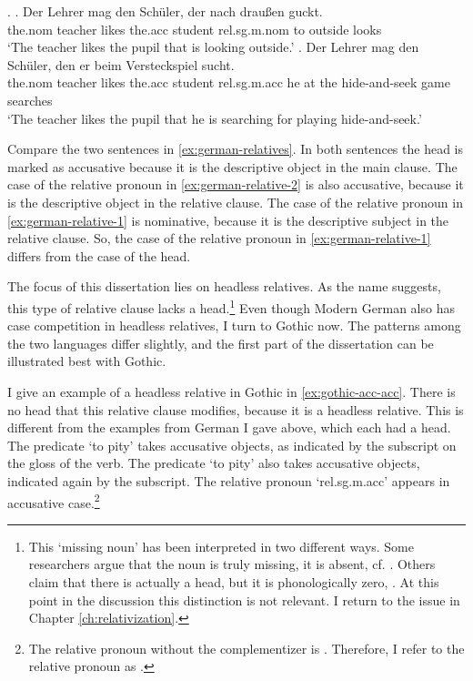 \ex.\label{ex:german-relatives}
\ag. Der Lehrer mag den Schüler, der nach draußen guckt.\\
 the.\ac{nom} teacher likes the.\ac{acc} student \ac{rel}.\ac{sg}.\ac{m}.\ac{nom} to outside looks\\
 `The teacher likes the pupil that is looking outside.'\label{ex:german-relative-1}
 \bg. Der Lehrer mag den Schüler, den er beim Versteckspiel sucht.\\
 the.\ac{nom} teacher likes the.\ac{acc} student \ac{rel}.\ac{sg}.\ac{m}.\ac{acc} he {at the} {hide-and-seek game} searches\\
 `The teacher likes the pupil that he is searching for playing hide-and-seek.'\label{ex:german-relative-2}

Compare the two sentences in \ref{ex:german-relatives}. In both sentences the head is marked as accusative because it is the descriptive object in the main clause. The case of the relative pronoun in \ref{ex:german-relative-2} is also accusative, because it is the descriptive object in the relative clause. The case of the relative pronoun in \ref{ex:german-relative-1} is nominative, because it is the descriptive subject in the relative clause. So, the case of the relative pronoun in \ref{ex:german-relative-1} differs from the case of the head.

The focus of this dissertation lies on headless relatives. As the name suggests, this type of relative clause lacks a head.\footnote{
This `missing noun' has been interpreted in two different ways. Some researchers argue that the noun is truly missing, it is absent, cf. \citealt{citko2005,vanriemsdijk2006}. Others claim that there is actually a head, but it is phonologically zero, \citealt{bresnan1978,groos1981,grosu2003}. At this point in the discussion this distinction is not relevant. I return to the issue in Chapter \ref{ch:relativization}.
}
Even though Modern German also has case competition in headless relatives, I turn to Gothic now. The patterns among the two languages differ slightly, and the first part of the dissertation can be illustrated best with Gothic.

I give an example of a headless relative in Gothic in \ref{ex:gothic-acc-acc}.
There is no head that this relative clause modifies, because it is a headless relative. This is different from the examples from German I gave above, which each had a head.
The predicate  `to pity' takes accusative objects, as indicated by the subscript on the gloss of the verb. The predicate  `to pity' also takes accusative objects, indicated again by the subscript.
The relative pronoun  `\ac{rel}.\ac{sg}.\ac{m}.\ac{acc}' appears in accusative case.\footnote{
The relative pronoun without the complementizer  is . Therefore, I refer to the relative pronoun as .
}

